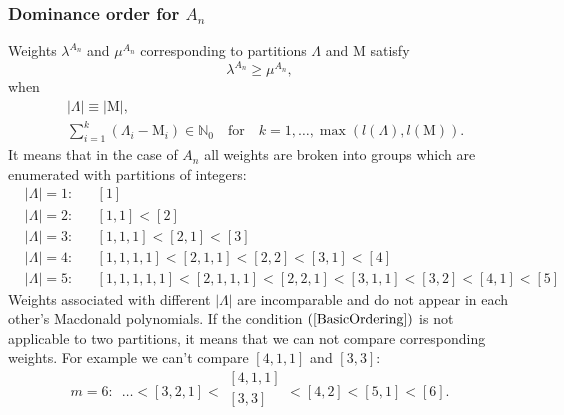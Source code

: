 \documentclass{article}
\begin{document}
\subsubsection{Dominance order for $A_n$}
Weights $\lambda^{A_n}$ and $\mu^{A_n}$ corresponding to partitions $\Lambda$ and $\text{M}$ satisfy
\begin{equation}
    \lambda^{A_n} \geq \mu^{A_n},
\end{equation}
when
\begin{align}
   & |\Lambda|\equiv|\text{M}|, \\
   &\sum_{i=1}^k (\Lambda_i -  \text{M}_i) \in \mathbb{N}_0 \quad \text{for} \quad k=1,\dots, \max(l(\Lambda),l(\text{M})). \label{BasicOrdering}
\end{align}
It means that in the case of $A_n$ all weights are broken into groups which are enumerated with partitions of integers:
\begin{equation}
    \begin{aligned}
        & |\Lambda| = 1: & & [1] \\
        & |\Lambda| = 2: & & [1,1] < [2] \\
        & |\Lambda| = 3: & & [1,1,1] <[2,1]<[3] \\
        & |\Lambda| = 4: & & [1,1,1,1] <[2,1,1]<[2,2] < [3,1] < [4] \\
        & |\Lambda| = 5: & & [1,1,1,1,1] < [2,1,1,1] < [2,2,1]<[3,1,1] < [3,2]<[4,1]<[5]
    \end{aligned}
\end{equation}
Weights associated with different $|\Lambda|$ are incomparable and do not appear in each other's Macdonald polynomials. If the condition $(\ref{BasicOrdering})$ is not applicable to two partitions, it means that we can not compare corresponding weights. For example we can't compare $[4,1,1]$ and $[3,3]$:
\begin{equation}
    m = 6: \,\,\, \dots < [3,2,1] <
    \begin{array}{c}
         [4,1,1] \\[0.2pt]
         [3,3] \\
    \end{array}
     < [4,2] < [5,1] <[6].
\end{equation}
\end{document}
